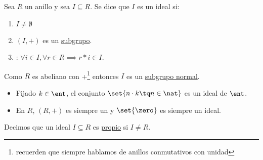 
\begin{defn}[Ideal] %
Sea $R$ un anillo y sea $I \subseteq R$. Se dice que $I$ es un ideal si:

	\begin{enumerate}
		\item $I \neq \emptyset$
		\item $(I, +)$ es un \underline{subgrupo}.
		\item {}: $\forall i \in I, \forall r \in R \implies r*i \in I$.
	\end{enumerate}
\end{defn}

\begin{lemma}
	Como $R$ es abeliano con +\footnote{recuerden que siempre hablamos de anillos conmutativos con unidad} entonces $I$ es un \underline{subgrupo normal}.
\end{lemma}

\begin{example}
	\begin{itemize}
		\item Fijado $k \in \ent$, el conjunto $\set{n\cdot k \tq n \in \nat }$ es un ideal de $\ent$.
		\item En $R$, $(R, +)$ es siempre un  y $\set{\zero}$ es siempre un ideal.
	\end{itemize}
\end{example}

\begin{defn}
Decimos que un ideal $I \subseteq R$ es \underline{propio} si $I \neq R$.
\end{defn}


